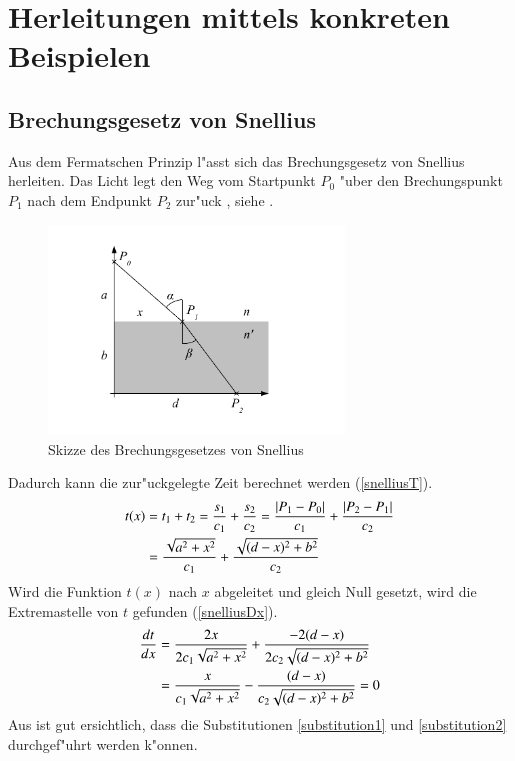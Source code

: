 \section{Herleitungen mittels konkreten Beispielen}
\subsection{Brechungsgesetz von Snellius \label{brechungsgesetz}}
Aus dem Fermatschen Prinzip l"asst sich das Brechungsgesetz von Snellius
herleiten.
Das Licht legt den Weg vom Startpunkt $P_0$ "uber den Brechungspunkt $P_1$ 
nach dem Endpunkt $P_2$ zur"uck \cite{Wikipedia}, siehe  .
\begin{figure}
\begin{center}
	\includegraphics[width=0.7\textwidth]{licht/picture/Brechung.pdf}
	\caption{Skizze des Brechungsgesetzes von Snellius}
	\label{Ab:brechung}
\end{center}
\end{figure}
Dadurch kann die zur"uckgelegte Zeit berechnet werden (\eqref{snelliusT}).
\begin{align}
t(x) &= t_1 + t_2 = \frac{s_1}{c_1} + \frac{s_2}{c_2} = \frac{|P_1 - P_0|}{c_1} + \frac{|P_2 - P_1|}{c_2} \notag \\
&= \frac{\sqrt{a^2 + x^2}}{c_1} + \frac{\sqrt{(d-x)^2 + b^2}}{c_2} \label{snelliusT}
\end{align}
Wird die Funktion $t(x)$ nach $x$ abgeleitet und gleich Null gesetzt, wird die Extremastelle von $t$ gefunden (\eqref{snelliusDx}).
\begin{align}
	\frac{dt}{dx} &= \frac{2 x}{2  c_1  \sqrt{a^2 + x^2}} + \frac{-2  (d-x)}{2  c_2  \sqrt{(d-x)^2 + b^2}} \notag \\
	&= \frac{x}{c_1 \sqrt{a^2 + x^2}} - \frac{(d-x)}{c_2  \sqrt{(d-x)^2 + b^2}} = 0 
	\label{snelliusDx}
\end{align}
Aus  ist gut ersichtlich, dass die Substitutionen \ref{substitution1} und \ref{substitution2} durchgef"uhrt werden k"onnen.
